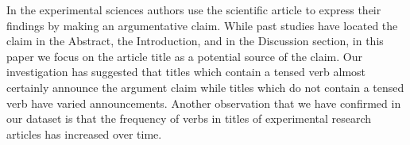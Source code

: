 In the experimental sciences authors use the scientific article to express their findings by making an argumentative claim.  While past studies have located the claim in the Abstract, the Introduction, and in the Discussion section, in this paper we focus on the article title as a potential source of the claim. Our investigation has suggested that titles which contain a tensed verb almost certainly announce the argument claim while titles which do not contain a tensed verb have varied announcements. Another observation that we have confirmed in our dataset is that the frequency of verbs in titles of experimental research articles has increased over time.
